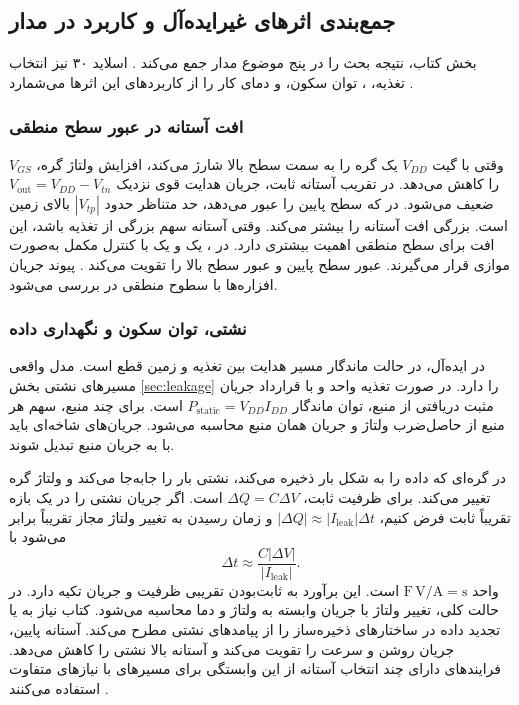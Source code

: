 \clearpage
\subsection{جمع‌بندی اثرهای غیرایده‌آل و کاربرد در مدار}
\label{sec:nonideal-summary}
بخش  کتاب، نتیجه بحث را در پنج موضوع مدار جمع می‌کند
\cite[صفحات ۸۶ و ۸۷]{weste}. اسلاید ۳۰ نیز انتخاب تغذیه،
، توان سکون،  و دمای کار را
از کاربردهای این اثرها می‌شمارد \cite{nonideal}.

\subsubsection*{افت آستانه در عبور سطح منطقی}
وقتی  با گیت \(V_{DD}\) یک گره را به سمت سطح بالا شارژ
می‌کند، افزایش ولتاژ گره، \(V_{GS}\) را کاهش می‌دهد. در تقریب
آستانه ثابت، جریان هدایت قوی نزدیک
\(V_{\mathrm{out}}=V_{DD}-V_{tn}\) ضعیف می‌شود. در  که
سطح پایین را عبور می‌دهد، حد متناظر حدود \(|V_{tp}|\) بالای زمین
است.  بزرگی افت آستانه را بیشتر می‌کند. وقتی آستانه
سهم بزرگی از تغذیه باشد، این افت برای سطح منطقی اهمیت بیشتری دارد.
در ، یک  و یک  با کنترل
مکمل به‌صورت موازی قرار می‌گیرند.  عبور سطح پایین و
 عبور سطح بالا را تقویت می‌کند
\cite[بخش ]{weste}. پیوند جریان افزاره‌ها با سطوح منطقی
در  بررسی می‌شود.

\subsubsection*{نشتی، توان سکون و نگهداری داده}
در  ایده‌آل، در حالت ماندگار مسیر هدایت بین تغذیه
و زمین قطع است. مدل واقعی مسیرهای نشتی بخش \ref{sec:leakage} را
دارد. در صورت تغذیه واحد و با قرارداد جریان مثبت دریافتی از منبع،
توان ماندگار \(P_{\mathrm{static}}=V_{DD}I_{DD}\) است.
برای چند منبع، سهم هر منبع از حاصل‌ضرب ولتاژ و جریان همان منبع
محاسبه می‌شود. جریان‌های شاخه‌ای باید با  به جریان منبع
تبدیل شوند.

در گره‌ای که داده را به شکل بار ذخیره می‌کند، نشتی بار را جابه‌جا
می‌کند و ولتاژ گره تغییر می‌کند. برای ظرفیت ثابت،
\(\Delta Q=C\Delta V\) است. اگر جریان نشتی را در یک بازه تقریباً
ثابت فرض کنیم، \(|\Delta Q|\approx|I_{\mathrm{leak}}|\Delta t\)
و زمان رسیدن به تغییر ولتاژ مجاز تقریباً برابر می‌شود با
\begin{equation}
 \Delta t\approx\frac{C|\Delta V|}{|I_{\mathrm{leak}}|}.
 \label{eq:retention-time-estimate}
\end{equation}
واحد \(\mathrm{F}\,\mathrm{V}/\mathrm{A}=\mathrm{s}\) است.
این برآورد به ثابت‌بودن تقریبی ظرفیت و جریان تکیه دارد. در حالت
کلی، تغییر ولتاژ با جریان وابسته به ولتاژ و دما محاسبه می‌شود.
کتاب نیاز به  یا تجدید داده در ساختارهای ذخیره‌ساز را
از پیامدهای نشتی مطرح می‌کند. آستانه پایین، جریان روشن و سرعت را
تقویت می‌کند و آستانه بالا نشتی را کاهش می‌دهد. فرایندهای دارای
چند انتخاب آستانه از این وابستگی برای مسیرهای با نیازهای متفاوت
استفاده می‌کنند \cite[صفحه ۸۷]{weste}.

